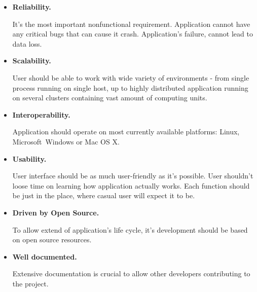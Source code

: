 \begin{itemize}

 \item {\bf Reliability.}

It's the most important nonfunctional requirement. Application cannot have any critical bugs that can cause it crash.
Application's failure, cannot lead to data loss. 

 \item {\bf Scalability.}

User should be able to work with wide variety of environments - from single process running on single host, up to
highly distributed application running on several clusters containing vast amount of computing units.

 \item {\bf Interoperability.}

Application should operate on most currently available platforms: Linux, Microsoft\textregistered~Windows\textregistered
or Mac OS X\textregistered.

\item {\bf Usability.}

User interface should be as much user-friendly as it's possible. User shouldn't loose time on learning how application
actually works. Each function should be just in the place, where casual user will expect it to be.

 \item {\bf Driven by Open Source.}

To allow extend of application's life cycle, it's development should be based on open source resources.

 \item {\bf Well documented.}

Extensive documentation is crucial to allow other developers contributing to the project.

\end{itemize}

